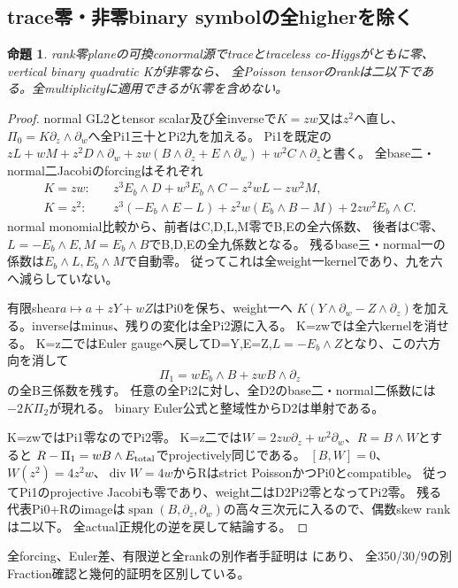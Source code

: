 \documentclass[a4paper,11pt]{ltjsarticle}
\newtheorem{proposition}{命題}[section]
\theoremstyle{definition}
\begin{document}
\subsection{trace零・非零binary symbolの全higherを除く}
\begin{proposition}\label{prop:plane-scalar-tracezero-nonzeroK-ranktwo}
rank零planeの可換conormal源でtraceとtraceless co-Higgsがともに零、vertical binary quadratic Kが非零なら、
全Poisson tensorのrankは二以下である。全multiplicityに適用できるがK零を含めない。
\end{proposition}
\begin{proof}
normal GL2とtensor scalar及び全inverseで$K=zw$又は$z^2$へ直し、
$\Pi_0=K\partial_z\wedge\partial_w$へ全Pi1三十とPi2九を加える。
Pi1を既定の$zL+wM+z^2D\wedge\partial_w+zw(B\wedge\partial_z+E\wedge\partial_w)+w^2C\wedge\partial_z$と書く。
全base二・normal二Jacobiのforcingはそれぞれ
\[
\begin{aligned}
 K=zw:&\quad z^3E_b\wedge D+w^3E_b\wedge C-z^2wL-zw^2M,\\
 K=z^2:&\quad z^3(-E_b\wedge E-L)+z^2w(E_b\wedge B-M)+2zw^2E_b\wedge C.
\end{aligned}
\]
normal monomial比較から、前者はC,D,L,M零でB,Eの全六係数、
後者はC零、$L=-E_b\wedge E,M=E_b\wedge B$でB,D,Eの全九係数となる。
残るbase三・normal一の係数は$E_b\wedge L,E_b\wedge M$で自動零。
従ってこれは全weight一kernelであり、九を六へ減らしていない。

有限shear$a\mapsto a+zY+wZ$はPi0を保ち、weight一へ
$K(Y\wedge\partial_w-Z\wedge\partial_z)$を加える。inverseはminus、残りの変化は全Pi2源に入る。
K=zwでは全六kernelを消せる。
K=z二ではEuler gaugeへ戻してD=Y,E=Z,$L=-E_b\wedge Z$となり、この六方向を消して
\[
 \Pi_1=wE_b\wedge B+zwB\wedge\partial_z
\]
の全B三係数を残す。
任意の全Pi2に対し、全D2のbase二・normal二係数には$-2K\Pi_2$が現れる。
binary Euler公式と整域性からD2は単射である。

K=zwではPi1零なのでPi2零。
K=z二では$W=2zw\partial_z+w^2\partial_w$、$R=B\wedge W$とすると
$R-\Pi_1=wB\wedge E_{\rm total}$でprojectively同じである。
$[B,W]=0$、$W(z^2)=4z^2w$、$\operatorname{div}W=4w$からRはstrict PoissonかつPi0とcompatible。
従ってPi1のprojective Jacobiも零であり、weight二はD2Pi2零となってPi2零。
残る代表Pi0+Rのimageは$\operatorname{span}(B,\partial_z,\partial_w)$の高々三次元に入るので、偶数skew rankは二以下。
全actual正規化の逆を戻して結論する。
\end{proof}
全forcing、Euler差、有限逆と全rankの別作者手証明は
にあり、
全350/30/9の別Fraction確認と幾何的証明を区別している。
\end{document}

